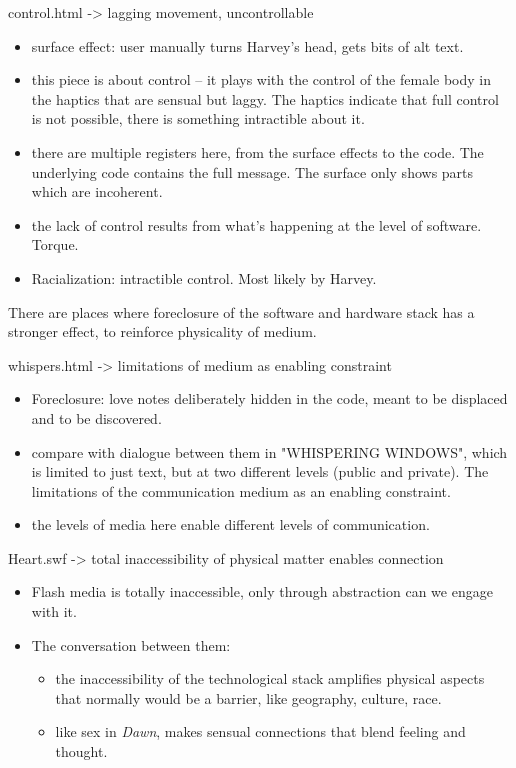 \documentclass[11pt]{article}
\begin{document}
\begin{enumerate}
control.html -> lagging movement, uncontrollable 
\begin{itemize}
\item surface effect: user manually turns Harvey's head, gets bits of alt
text.
\item this piece is about control -- it plays with the control of the
female body in the haptics that are sensual but laggy. The haptics
indicate that full control is not possible, there is something
intractible about it.
\item there are multiple registers here, from the surface effects to the
code. The underlying code contains the full message. The surface
only shows parts which are incoherent.
\item the lack of control results from what's happening at the level of
software. Torque.
\item Racialization: intractible control. Most likely by Harvey.
\end{itemize}

There are places where foreclosure of the software and hardware stack
has a stronger effect, to reinforce physicality of medium. 

whispers.html -> limitations of medium as enabling constraint
\begin{itemize}
\item Foreclosure: love notes deliberately hidden in the code, meant to be
displaced and to be discovered.
\item compare with dialogue between them in "WHISPERING WINDOWS", which is
limited to just text, but at two different levels (public and
private). The limitations of the communication medium as an enabling
constraint.
\item the levels of media here enable different levels of communication.
\end{itemize}

Heart.swf -> total inaccessibility of physical matter enables
connection
\begin{itemize}
\item Flash media is totally inaccessible, only through abstraction can we
engage with it.
\item The conversation between them: 
\begin{itemize}
\item the inaccessibility of the technological stack amplifies physical
aspects that normally would be a barrier, like geography, culture,
race.
\item like sex in \emph{Dawn}, makes sensual connections that blend feeling
and thought.
\end{itemize}
\end{itemize}


\end{enumerate}
\end{document}
